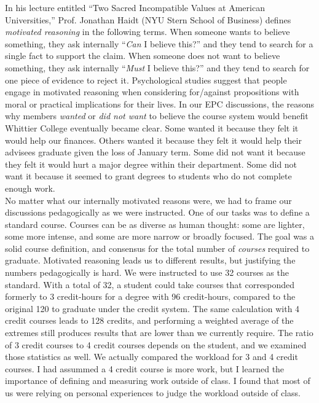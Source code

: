 \documentclass[../../../main.tex]{subfiles}
\begin{document}
In his lecture entitled ``Two Sacred Incompatible Values at American Universities,'' \cite{haidt} Prof. Jonathan Haidt (NYU Stern School of Business) defines \textit{motivated reasoning} in the following terms.  When someone wants to believe something, they ask internally ``\textit{Can} I believe this?'' and they tend to search for a single fact to support the claim.  When someone does not want to believe something, they ask internally ``\textit{Must} I believe this?'' and they tend to search for one piece of evidence to reject it.  Psychological studies suggest that people engage in motivated reasoning when considering for/against propositions with moral or practical implications for their lives.  In our EPC discussions, the reasons why members \textit{wanted} or \textit{did not want} to believe the course system would benefit Whittier College eventually became clear.  Some wanted it because they felt it would help our finances.  Others wanted it because they felt it would help their advisees graduate given the loss of January term.  Some did not want it because they felt it would hurt a major degree within their department.  Some did not want it because it seemed to grant degrees to students who do not complete enough work.  
\\
\vspace{0.25cm}
No matter what our internally motivated reasons were, we had to frame our discussions pedagogically as we were instructed.  One of our tasks was to define a standard course.  Courses can be as diverse as human thought: some are lighter, some more intense, and some are more narrow or broadly focused.  The goal was a solid course definition, and consensus for the total number of \textit{courses} required to graduate.  Motivated reasoning leads us to different results, but justifying the numbers pedagogically is hard.  We were instructed to use 32 courses as the standard.  With a total of 32, a student could take courses that corresponded formerly to 3 credit-hours for a degree with 96 credit-hours, compared to the original 120 to graduate under the credit system.  The same calculation with 4 credit courses leads to 128 credits, and performing a weighted average of the extremes still produces results that are lower than we currently require.  The ratio of 3 credit courses to 4 credit courses depends on the student, and we examined those statistics as well.  We actually compared the workload for 3 and 4 credit courses.  I had assummed a 4 credit course is more work, but I learned the importance of defining and measuring work outside of class.  I found that most of us were relying on personal experiences to judge the workload outside of class.
\end{document}
